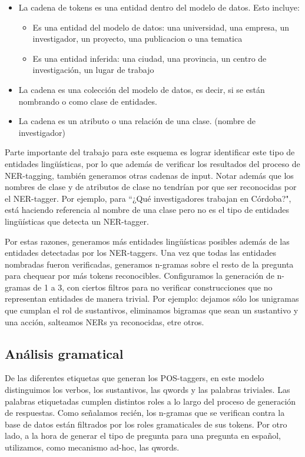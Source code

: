 \begin{itemize}
  \item La cadena de tokens es una entidad dentro del modelo de datos. Esto incluye:
    \begin{itemize}
      \item Es una entidad del modelo de datos: una universidad, una empresa, un investigador, un proyecto, una publicacion o una tematica
      \item Es una entidad inferida: una ciudad, una provincia, un centro de investigación, un lugar de trabajo
    \end{itemize}
  \item La cadena es una colección del modelo de datos, es decir, si se están nombrando  o  como clase de entidades.
  \item La cadena es un atributo o una relación de una clase. (nombre de investigador)
\end{itemize}

Parte importante del trabajo para este esquema es lograr identificar este tipo de entidades lingüísticas, por lo que además de verificar los resultados del proceso de NER-tagging, también generamos otras cadenas de input. Notar además que los nombres de clase y de atributos de clase no tendrían por que ser reconocidas por el NER-tagger. Por ejemplo, para ``¿Qué investigadores trabajan en Córdoba?",  está haciendo referencia al nombre de una clase pero no es el tipo de entidades lingüísticas que detecta un NER-tagger. 

Por estas razones, generamos más entidades lingüísticas posibles además de las entidades detectadas por los NER-taggers. Una vez que todas las entidades nombradas fueron verificadas, generamos n-gramas sobre el resto de la pregunta para chequear por más tokens reconocibles. Configuramos la generación de n-gramas de 1 a 3, con ciertos filtros para no verificar construcciones que no representan entidades de manera trivial. Por ejemplo: dejamos sólo los unigramas que cumplan el rol de sustantivos, eliminamos bigramas que sean un sustantivo y una acción, salteamos NERs ya reconocidas, etre otros.


\subsection{Análisis gramatical}
\label{subsec:impl-pos}
De las diferentes etiquetas que generan los POS-taggers, en este modelo distinguimos los verbos, los sustantivos, las qwords y las palabras triviales. 
Las palabras etiquetadas cumplen distintos roles a lo largo del proceso de generación de respuestas. Como señalamos recién, los n-gramas que se verifican contra la base de datos están filtrados por los roles gramaticales de sus tokens. Por otro lado, a la hora de generar el tipo de pregunta para una pregunta en español, utilizamos, como mecanismo ad-hoc, las qwords. 

